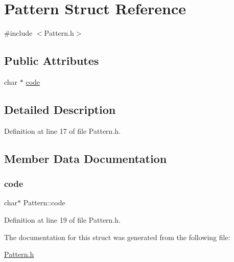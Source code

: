 \hypertarget{struct_pattern}{}\section{Pattern Struct Reference}
\label{struct_pattern}


{\ttfamily \#include $<$Pattern.\+h$>$}

\subsection*{Public Attributes}
\begin{DoxyCompactItemize}
\item 
char $\ast$ \hyperlink{struct_pattern_aff9615a7cae264a5d64ec5800ba908c3}{code}
\end{DoxyCompactItemize}


\subsection{Detailed Description}


Definition at line 17 of file Pattern.\+h.



\subsection{Member Data Documentation}
\hypertarget{struct_pattern_aff9615a7cae264a5d64ec5800ba908c3}{}\label{struct_pattern_aff9615a7cae264a5d64ec5800ba908c3} 
\subsubsection{\texorpdfstring{code}{code}}
{\footnotesize\ttfamily char$\ast$ Pattern\+::code}



Definition at line 19 of file Pattern.\+h.



The documentation for this struct was generated from the following file\+:\begin{DoxyCompactItemize}
\item 
\hyperlink{_pattern_8h}{Pattern.\+h}\end{DoxyCompactItemize}
